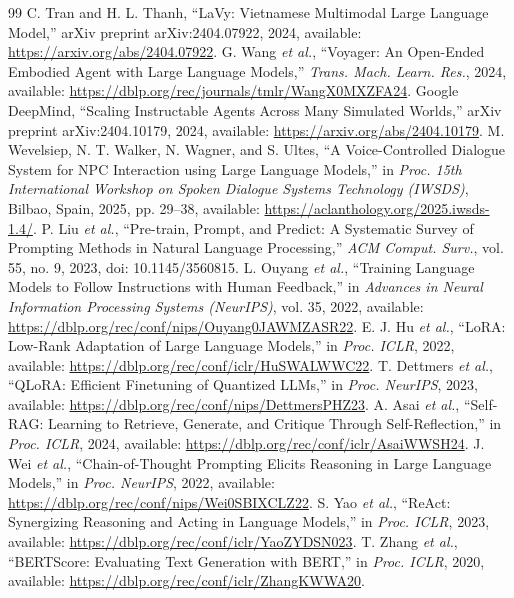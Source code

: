 ﻿\documentclass[a4paper,12pt]{article}
\begin{document}
\begin{thebibliography}{99}
 C. Tran and H. L. Thanh, ``LaVy: Vietnamese Multimodal Large Language Model,'' arXiv preprint arXiv:2404.07922, 2024, available: \url{https://arxiv.org/abs/2404.07922}.
 G. Wang \emph{et al.}, ``Voyager: An Open-Ended Embodied Agent with Large Language Models,'' \emph{Trans. Mach. Learn. Res.}, 2024, available: \url{https://dblp.org/rec/journals/tmlr/WangX0MXZFA24}.
 Google DeepMind, ``Scaling Instructable Agents Across Many Simulated Worlds,'' arXiv preprint arXiv:2404.10179, 2024, available: \url{https://arxiv.org/abs/2404.10179}.
 M. Wevelsiep, N. T. Walker, N. Wagner, and S. Ultes, ``A Voice-Controlled Dialogue System for NPC Interaction using Large Language Models,'' in \emph{Proc. 15th International Workshop on Spoken Dialogue Systems Technology (IWSDS)}, Bilbao, Spain, 2025, pp. 29--38, available: \url{https://aclanthology.org/2025.iwsds-1.4/}.
 P. Liu \emph{et al.}, ``Pre-train, Prompt, and Predict: A Systematic Survey of Prompting Methods in Natural Language Processing,'' \emph{ACM Comput. Surv.}, vol. 55, no. 9, 2023, doi: 10.1145/3560815.
 L. Ouyang \emph{et al.}, ``Training Language Models to Follow Instructions with Human Feedback,'' in \emph{Advances in Neural Information Processing Systems (NeurIPS)}, vol. 35, 2022, available: \url{https://dblp.org/rec/conf/nips/Ouyang0JAWMZASR22}.
 E. J. Hu \emph{et al.}, ``LoRA: Low-Rank Adaptation of Large Language Models,'' in \emph{Proc. ICLR}, 2022, available: \url{https://dblp.org/rec/conf/iclr/HuSWALWWC22}.
 T. Dettmers \emph{et al.}, ``QLoRA: Efficient Finetuning of Quantized LLMs,'' in \emph{Proc. NeurIPS}, 2023, available: \url{https://dblp.org/rec/conf/nips/DettmersPHZ23}.
 A. Asai \emph{et al.}, ``Self-RAG: Learning to Retrieve, Generate, and Critique Through Self-Reflection,'' in \emph{Proc. ICLR}, 2024, available: \url{https://dblp.org/rec/conf/iclr/AsaiWWSH24}.
 J. Wei \emph{et al.}, ``Chain-of-Thought Prompting Elicits Reasoning in Large Language Models,'' in \emph{Proc. NeurIPS}, 2022, available: \url{https://dblp.org/rec/conf/nips/Wei0SBIXCLZ22}.
 S. Yao \emph{et al.}, ``ReAct: Synergizing Reasoning and Acting in Language Models,'' in \emph{Proc. ICLR}, 2023, available: \url{https://dblp.org/rec/conf/iclr/YaoZYDSN023}.
 T. Zhang \emph{et al.}, ``BERTScore: Evaluating Text Generation with BERT,'' in \emph{Proc. ICLR}, 2020, available: \url{https://dblp.org/rec/conf/iclr/ZhangKWWA20}.

\end{thebibliography}
\end{document}
